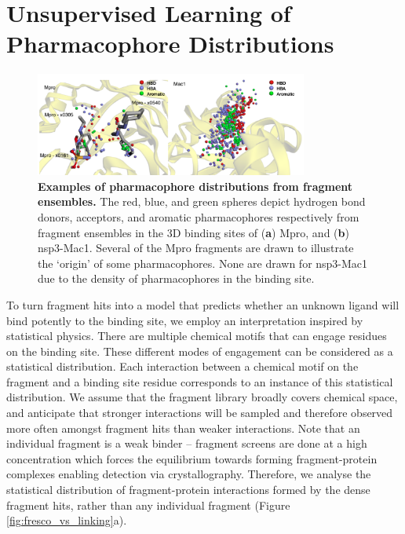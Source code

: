\section{Unsupervised Learning of Pharmacophore Distributions} \label{sec:model}

\begin{figure}[th]
 \centering
 \includegraphics[width=0.8\textwidth]{Chapters/Fresco/Figs/pharmacophores.png}
 \caption{\textbf{Examples of pharmacophore distributions from fragment ensembles.} The red, blue, and green spheres depict hydrogen bond donors, acceptors, and aromatic pharmacophores respectively from fragment ensembles in the 3D binding sites of (\textbf{a}) Mpro, and (\textbf{b}) nsp3-Mac1. Several of the Mpro fragments are drawn to illustrate the ‘origin’ of some pharmacophores. None are drawn for nsp3-Mac1 due to the density of pharmacophores in the binding site.}
 \label{fig:pharmacophores}
\end{figure}


To turn fragment hits into a model that predicts whether an unknown ligand will bind potently to the binding site, we employ an interpretation inspired by statistical physics. There are multiple chemical motifs that can engage residues on the binding site. These different modes of engagement can be considered as a statistical distribution. Each interaction between a chemical motif on the fragment and a binding site residue corresponds to an instance of this statistical distribution. We assume that the fragment library broadly covers chemical space, and anticipate that stronger interactions will be sampled and therefore observed more often amongst fragment hits than weaker interactions. Note that an individual fragment is a weak binder -- fragment screens are done at a high concentration which forces the equilibrium towards forming fragment-protein complexes enabling detection via crystallography. Therefore, we analyse the statistical distribution of fragment-protein interactions formed by the dense fragment hits, rather than any individual fragment (Figure \ref{fig:fresco_vs_linking}a).

